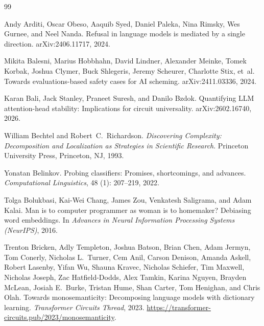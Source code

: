 \documentclass{article}
\begin{document}
\begin{thebibliography}{99}

Andy Arditi, Oscar Obeso, Aaquib Syed, Daniel Paleka, Nina Rimsky, Wes Gurnee,
  and Neel Nanda.
\newblock Refusal in language models is mediated by a single direction.
\newblock arXiv:2406.11717, 2024.

Mikita Balesni, Marius Hobbhahn, David Lindner, Alexander Meinke, Tomek
  Korbak, Joshua Clymer, Buck Shlegeris, Jeremy Scheurer, Charlotte Stix,
  et~al.
\newblock Towards evaluations-based safety cases for {AI} scheming.
\newblock arXiv:2411.03336, 2024.

Karan Bali, Jack Stanley, Praneet Suresh, and Danilo Bzdok.
\newblock Quantifying {LLM} attention-head stability: Implications for circuit
  universality.
\newblock arXiv:2602.16740, 2026.

William Bechtel and Robert~C.\ Richardson.
\newblock \emph{Discovering Complexity: Decomposition and Localization as
  Strategies in Scientific Research}.
\newblock Princeton University Press, Princeton, NJ, 1993.

Yonatan Belinkov.
\newblock Probing classifiers: Promises, shortcomings, and advances.
\newblock \emph{Computational Linguistics}, 48 (1): 207--219, 2022.

Tolga Bolukbasi, Kai-Wei Chang, James Zou, Venkatesh Saligrama, and Adam Kalai.
\newblock Man is to computer programmer as woman is to homemaker? Debiasing word
  embeddings.
\newblock In \emph{Advances in Neural Information Processing Systems (NeurIPS)}, 2016.

Trenton Bricken, Adly Templeton, Joshua Batson, Brian Chen, Adam Jermyn,
  Tom Conerly, Nicholas L.\ Turner, Cem Anil, Carson Denison, Amanda Askell,
  Robert Lasenby, Yifan Wu, Shauna Kravec, Nicholas Schiefer, Tim Maxwell,
  Nicholas Joseph, Zac Hatfield-Dodds, Alex Tamkin, Karina Nguyen, Brayden
  McLean, Josiah E.\ Burke, Tristan Hume, Shan Carter, Tom Henighan, and
  Chris Olah.
\newblock Towards monosemanticity: Decomposing language models with dictionary
  learning.
\newblock \emph{Transformer Circuits Thread}, 2023.
\newblock \url{https://transformer-circuits.pub/2023/monosemanticity}.


\end{thebibliography}
\end{document}

